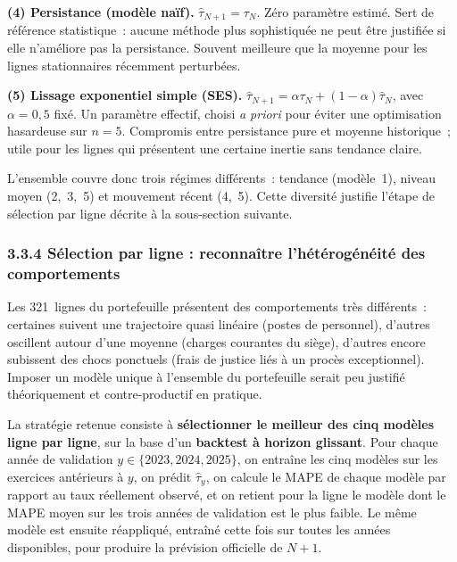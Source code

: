 \textbf{(4) Persistance (mod\`ele na\"if).} $\widehat{\tau}_{N+1} = \tau_N$.
Z\'ero param\`etre estim\'e. Sert de r\'ef\'erence statistique~: aucune
m\'ethode plus sophistiqu\'ee ne peut \^etre justifi\'ee si elle n'am\'eliore
pas la persistance. Souvent meilleure que la moyenne pour les lignes
stationnaires r\'ecemment perturb\'ees.

\textbf{(5) Lissage exponentiel simple (SES).}
$\widehat{\tau}_{N+1} = \alpha \tau_N + (1-\alpha) \widehat{\tau}_N$, avec
$\alpha = 0{,}5$ fix\'e. Un param\`etre effectif, choisi \textit{a priori}
pour \'eviter une optimisation hasardeuse sur $n=5$. Compromis entre
persistance pure et moyenne historique~; utile pour les lignes qui pr\'esentent
une certaine inertie sans tendance claire.

L'ensemble couvre donc trois r\'egimes diff\'erents~: tendance (mod\`ele~1),
niveau moyen (2,~3,~5) et mouvement r\'ecent (4,~5). Cette diversit\'e
justifie l'\'etape de s\'election par ligne d\'ecrite \`a la sous-section
suivante.

\subsubsection*{3.3.4 \quad S\'election par ligne : reconna\^itre l'h\'et\'erog\'en\'eit\'e des comportements}

Les 321~lignes du portefeuille pr\'esentent des comportements tr\`es
diff\'erents~: certaines suivent une trajectoire quasi lin\'eaire (postes de
personnel), d'autres oscillent autour d'une moyenne (charges courantes du
si\`ege), d'autres encore subissent des chocs ponctuels (frais de justice
li\'es \`a un proc\`es exceptionnel). Imposer un mod\`ele unique \`a
l'ensemble du portefeuille serait peu justifi\'e th\'eoriquement et
contre-productif en pratique.

La strat\'egie retenue consiste \`a \textbf{s\'electionner le meilleur des
cinq mod\`eles ligne par ligne}, sur la base d'un \textbf{backtest \`a
horizon glissant}. Pour chaque ann\'ee de validation
$y \in \{2023, 2024, 2025\}$, on entra\^ine les cinq mod\`eles sur les
exercices ant\'erieurs \`a $y$, on pr\'edit $\widehat{\tau}_y$, on calcule le
MAPE de chaque mod\`ele par rapport au taux r\'eellement observ\'e, et on
retient pour la ligne le mod\`ele dont le MAPE moyen sur les trois ann\'ees
de validation est le plus faible. Le m\^eme mod\`ele est ensuite r\'eappliqu\'e,
entra\^in\'e cette fois sur toutes les ann\'ees disponibles, pour produire la
pr\'evision officielle de $N+1$.

